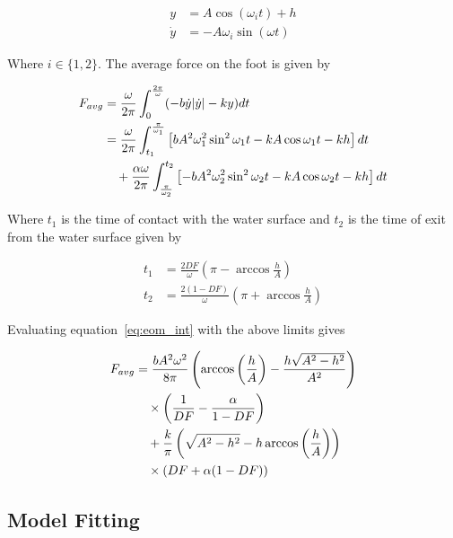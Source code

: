 \begin{align}
	y &= A \cos(\omega_i t) + h \\
	\dot{y} &= -A \omega_i \sin (\omega t)
\end{align}

\noindent Where $i \in \{1,2\}$. The average force on the foot is given by 

\begin{align}
	F_{avg} &= \frac{\omega}{2 \pi} \int_0^{\frac{2 \pi}{\omega}} (-b \dot{y} | \dot{y} | - k y) dt \notag \\
			&= \frac{\omega}{2 \pi} \int_{t_1}^{\frac{\pi}{\omega_1}} \left[ b A^2 \omega_1^2 \sin^2 \omega_1 t - k A \cos \omega_1 t - kh  \right] dt \notag \\
			&\quad + \frac{ \alpha \omega}{2 \pi}  \int_{\frac{\pi}{\omega_2}}^{t_2} \left[ -b A^2 \omega_2^2 \sin^2 \omega_2 t - k A \cos \omega_2 t - kh \right] dt \label{eq:eom_int}
\end{align}

\noindent Where $t_1$ is the time of contact with the water surface and $t_2$ is the time of exit from the water surface given by 

\begin{align}
	t_1 &= \frac{2 DF}{\omega} \left( \pi - \arccos \frac{h}{A} \right) \\
	t_2 &= \frac{2 (1 - DF)}{\omega} \left( \pi + \arccos \frac{h}{A}\right)
\end{align}

\noindent Evaluating equation~\ref{eq:eom_int} with the above limits gives

\begin{align}
	F_{avg} &= \frac{b A^2 \omega^2}{8 \pi} \left( \arccos \left(\frac{h}{A}\right) - \frac{h \sqrt{A^2 - h^2}}{A^2} \right) \notag \\
		    &\quad \times \left( \frac{1}{DF} - \frac{\alpha}{1 - DF} \right) \notag \\
			&\quad + \frac{k}{\pi}  \left( \sqrt{A^2 - h^2} - h \arccos \left(\frac{h}{A}\right) \right) \notag \\
			&\quad \times (DF + \alpha (1-DF)) \label{eq:eom_avg}
\end{align}

\subsection{Model Fitting}

